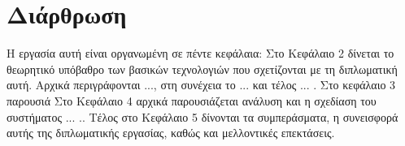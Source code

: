 \section{Διάρθρωση}
Η εργασία αυτή είναι οργανωμένη σε πέντε κεφάλαια: Στο Κεφάλαιο 2
δίνεται το θεωρητικό υπόβαθρο των βασικών τεχνολογιών που
σχετίζονται με τη διπλωματική αυτή. Αρχικά περιγράφονται ..., στη συνέχεια το ... και τέλος ... . 
Στο κεφάλαιο 3 παρουσιά
Στο Κεφάλαιο 4 αρχικά παρουσιάζεται ανάλυση και η σχεδίαση του συστήματος ... .. Τέλος στο Κεφάλαιο 5 δίνονται τα συμπεράσματα, η συνεισφορά αυτής της
διπλωματικής εργασίας, καθώς και μελλοντικές επεκτάσεις.